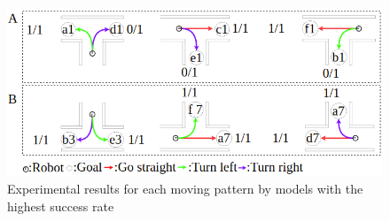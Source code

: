 \begin{figure}[hbtp]
  \centering
 \includegraphics[keepaspectratio, scale=0.45]
      {images/real_model3.png}
 \caption{Experimental results for each moving pattern by models with the highest success rate}
 \label{Fig:real_model3}
\end{figure}

\newpage
